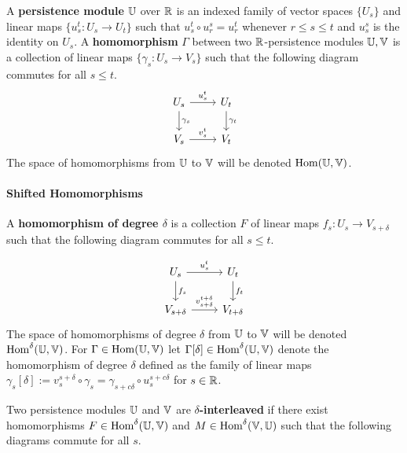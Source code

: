 
A \textbf{persistence module} $\mathbb{U}$ over $\mathbb{R}$ is an indexed family of vector spaces $\{U_s\}$ and linear maps $\{u_s^t : U_s\to U_t\}$ such that $u^t_s\circ u_r^s = u_r^t$ whenever $r\leq s\leq t$ and $u_s^s$ is the identity on $U_s$.
A \textbf{homomorphism} $\Gamma$ between two $\mathbb{R}$-persistence modules $\mathbb{U}, \mathbb{V}$ is a collection of linear maps $\{\gamma_s : U_s\to V_s\}$ such that the following diagram commutes for all $s\leq t$.
\begin{equation}\label{dgm:homomorphism}
  \begin{tikzcd}
    U_s\arrow{r}{u_s^t}\arrow{d}{\gamma_s} &
    U_t\arrow{d}{\gamma_t}\\
    V_s\arrow{r}{v_s^t} &
    V_t
\end{tikzcd}\end{equation}
The space of homomorphisms from $\mathbb{U}$ to $\mathbb{V}$ will be denoted $\mathrm{Hom}(\mathbb{U}, \mathbb{V})$.

\paragraph{Shifted Homomorphisms}

A \textbf{homomorphism of degree $\delta$} is a collection $F$ of linear maps $f_s : U_s\to V_{s+\delta}$ such that the following diagram commutes for all $s\leq t$.

\begin{equation}\label{dgm:shifted_homomorphism}
  \begin{tikzcd}
    U_s\arrow{r}{u_s^t}\arrow{d}{f_s} &
    U_t\arrow{d}{f_t}\\
    V_{s+\delta}\arrow{r}{v_{s+\delta}^{t+\delta}} &
    V_{t +\delta}
\end{tikzcd}\end{equation}
The space of homomorphisms of degree $\delta$ from $\mathbb{U}$ to $\mathbb{V}$ will be denoted $\mathrm{Hom}^\delta(\mathbb{U}, \mathbb{V})$.
For $\Gamma\in\mathrm{Hom}(\mathbb{U},\mathbb{V})$ let $\Gamma[\delta]\in\mathrm{Hom}^\delta(\mathbb{U},\mathbb{V})$ denote the homomorphism of degree $\delta$ defined as the family of linear maps $\gamma_s[\delta] := v_s^{s+\delta}\circ \gamma_s = \gamma_{s+c\delta}\circ u_s^{s+c\delta}$ for $s\in\mathbb{R}$.

Two persistence modules $\mathbb{U}$ and $\mathbb{V}$ are \textbf{$\delta$-interleaved} if there exist homomorphisms $F\in\mathrm{Hom}^\delta(\mathbb{U}, \mathbb{V})$ and $M \in\mathrm{Hom}^\delta(\mathbb{V},\mathbb{U})$ such that the following diagrams commute for all $s$.

